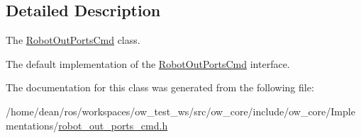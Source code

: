 \subsection{Detailed Description}
The \hyperlink{classow__core_1_1RobotOutPortsCmd}{Robot\+Out\+Ports\+Cmd} class. 

The default implementation of the \hyperlink{classow__core_1_1RobotOutPortsCmd}{Robot\+Out\+Ports\+Cmd} interface. 

The documentation for this class was generated from the following file\+:\begin{DoxyCompactItemize}
\item 
/home/dean/ros/workspaces/ow\+\_\+test\+\_\+ws/src/ow\+\_\+core/include/ow\+\_\+core/\+Implementations/\hyperlink{robot__out__ports__cmd_8h}{robot\+\_\+out\+\_\+ports\+\_\+cmd.\+h}\end{DoxyCompactItemize}
